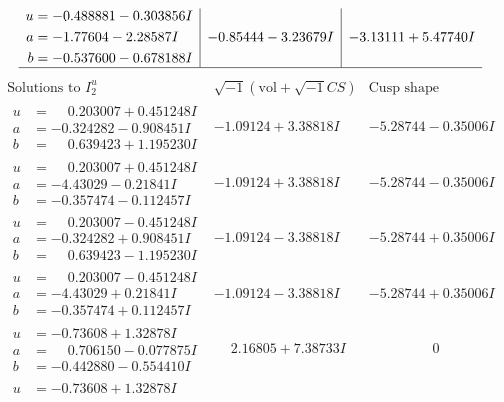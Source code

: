 \documentclass[1p]{elsarticle_modified}
\theoremstyle{definition}
\newcommand{\I}{\sqrt{-1}}
\begin{document}
$$\begin{array}{c|c|c}
\begin{aligned}
u &= -0.488881 - 0.303856 I \\
a &= -1.77604 - 2.28587 I \\
b &= -0.537600 - 0.678188 I\end{aligned}
 & -0.85444 - 3.23679 I & -3.13111 + 5.47740 I\\
 \hline 
 \end{array}$$\newpage$$\begin{array}{c|c|c}  
\text{Solutions to }I^u_{2}& \I (\text{vol} + \sqrt{-1}CS) & \text{Cusp shape}\\
 \hline 
\begin{aligned}
u &= \phantom{-}0.203007 + 0.451248 I \\
a &= -0.324282 - 0.908451 I \\
b &= \phantom{-}0.639423 + 1.195230 I\end{aligned}
 & -1.09124 + 3.38818 I & -5.28744 - 0.35006 I \\ \hline\begin{aligned}
u &= \phantom{-}0.203007 + 0.451248 I \\
a &= -4.43029 - 0.21841 I \\
b &= -0.357474 - 0.112457 I\end{aligned}
 & -1.09124 + 3.38818 I & -5.28744 - 0.35006 I \\ \hline\begin{aligned}
u &= \phantom{-}0.203007 - 0.451248 I \\
a &= -0.324282 + 0.908451 I \\
b &= \phantom{-}0.639423 - 1.195230 I\end{aligned}
 & -1.09124 - 3.38818 I & -5.28744 + 0.35006 I \\ \hline\begin{aligned}
u &= \phantom{-}0.203007 - 0.451248 I \\
a &= -4.43029 + 0.21841 I \\
b &= -0.357474 + 0.112457 I\end{aligned}
 & -1.09124 - 3.38818 I & -5.28744 + 0.35006 I \\ \hline\begin{aligned}
u &= -0.73608 + 1.32878 I \\
a &= \phantom{-}0.706150 - 0.077875 I \\
b &= -0.442880 - 0.554410 I\end{aligned}
 & \phantom{-}2.16805 + 7.38733 I & \phantom{-0.000000 } 0 \\ \hline\begin{aligned}
u &= -0.73608 + 1.32878 I \\

\end{aligned}
\end{array}$$
\end{document}
